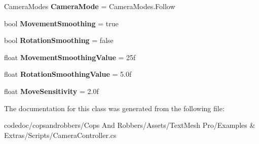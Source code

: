 \begin{DoxyCompactItemize}
Camera\+Modes {\bfseries Camera\+Mode} = Camera\+Modes.\+Follow
\item 
\mbox{\label{classTMPro_1_1Examples_1_1CameraController_a88aeb1dacfab4311497e12b63d9a0ead}} 
bool {\bfseries Movement\+Smoothing} = true
\item 
\mbox{\label{classTMPro_1_1Examples_1_1CameraController_a3e2c0e89101934e95f27fa271ff05d14}} 
bool {\bfseries Rotation\+Smoothing} = false
\item 
\mbox{\label{classTMPro_1_1Examples_1_1CameraController_add5727218e5af8bf5c4d50ecbc69eff2}} 
float {\bfseries Movement\+Smoothing\+Value} = 25f
\item 
\mbox{\label{classTMPro_1_1Examples_1_1CameraController_a004e199cff2c8738cc9584087357444d}} 
float {\bfseries Rotation\+Smoothing\+Value} = 5.\+0f
\item 
\mbox{\label{classTMPro_1_1Examples_1_1CameraController_af5ce7ae7b15ae2b86b4d7b4ad077d71a}} 
float {\bfseries Move\+Sensitivity} = 2.\+0f
\end{DoxyCompactItemize}


The documentation for this class was generated from the following file\+:\begin{DoxyCompactItemize}
\item 
codedoc/copsandrobbers/\+Cops And Robbers/\+Assets/\+Text\+Mesh Pro/\+Examples \& Extras/\+Scripts/Camera\+Controller.\+cs\end{DoxyCompactItemize}
